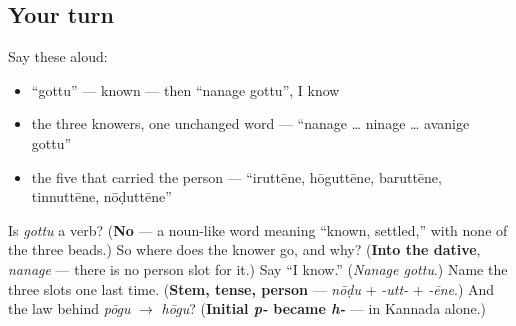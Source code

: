 \subsection*{Your turn}
Say these aloud:

\begin{itemize}
\raggedright
  \item \textquotedblleft{}gottu\textquotedblright{} — known — then \textquotedblleft{}nanage gottu\textquotedblright{}, I know
  \item the three knowers, one unchanged word — \textquotedblleft{}nanage … ninage … avanige gottu\textquotedblright{}
  \item the five that carried the person — \textquotedblleft{}iruttēne, hōguttēne, baruttēne, tinnuttēne, nōḍuttēne\textquotedblright{}
\end{itemize}

\begin{tcolorbox}[breakable,colback=teal!4,colframe=teal!35!black,title={Before you move on}]
Is \emph{gottu} a verb? (\textbf{No} — a noun-like word meaning \textquotedblleft{}known, settled,\textquotedblright{} with none of the three beads.) So where does the knower go, and why? (\textbf{Into the dative}, \emph{nanage} — there is no person slot for it.) Say \textquotedblleft{}I know.\textquotedblright{} (\emph{Nanage gottu}.) Name the three slots one last time. (\textbf{Stem, tense, person} — \emph{nōḍu} + \emph{-utt-} + \emph{-ēne}.) And the law behind \emph{pōgu} $\to$ \emph{hōgu}? (\textbf{Initial \emph{p-} became \emph{h-}} — in Kannada alone.)
\end{tcolorbox}
